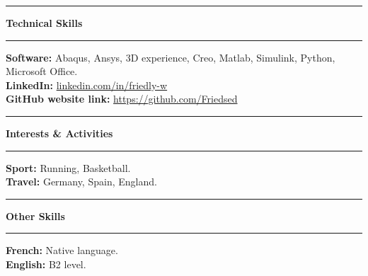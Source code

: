 \documentclass[9pt,a4paper]{article}
\begin{document}
	\vspace{0.3cm}
	
	\hrule
	\vspace{0.1cm}
	{\large \textbf{Technical Skills}}
	\vspace{0.1cm}
	\hrule
	\vspace{0.2cm}
	
	\textbf{Software:} Abaqus, Ansys, 3D experience, Creo, Matlab, Simulink, Python, Microsoft Office.\\
	\textbf{LinkedIn:} \href{https://www.linkedin.com/in/friedly-w/}{linkedin.com/in/friedly-w}\\
	\textbf{GitHub website link:} \href{https://github.com/Friedsed}{https://github.com/Friedsed}
	
	\vspace{0.5cm}
	
	\hrule
	\vspace{0.1cm}
	{\large \textbf{Interests \& Activities}}
	\vspace{0.1cm}
	\hrule
	\vspace{0.2cm}
	
	\textbf{Sport:} Running, Basketball.\\
	\textbf{Travel:} Germany, Spain, England.
	
	\vspace{0.3cm}
	
	\hrule
	\vspace{0.1cm}
	{\large \textbf{Other Skills}}
	\vspace{0.1cm}
	\hrule
	\vspace{0.2cm}
	
	\textbf{French:} Native language.\\
	\textbf{English:} B2 level.\\
	
	
\end{document}
